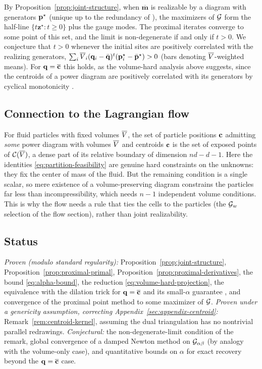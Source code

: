 \documentclass[main.tex]{subfiles}
\providecommand{\momset}{\mathcal{M}}            %
\providecommand{\tmom}{\overline{\mathbf{m}}}    %
\providecommand{\gen}{\mathbf{z}}                %
\providecommand{\convset}{\mathcal{C}}           %
\providecommand{\regdual}{\jointdual_{\alpha\beta}} %
\begin{document}
\begin{remark}
By Proposition~\ref{prop:joint-structure}, when $\tmom$ is realizable by a diagram with generators $\mathbf{p}^\star$ (unique up to the redundancy of \citet[Lemma~2.1]{Bourne2025Inverting}), the maximizers of $\mathcal{G}$ form the half-line $\{ t\gen^\star : t \ge 0 \}$ plus the gauge modes.
The proximal iterates converge to some point of this set, and the limit is non-degenerate if and only if $t > 0$.
We conjecture that $t > 0$ whenever the initial sites are positively correlated with the realizing generators, $\sum_i \overline{V}_i (\mathbf{q}_i - \bar{\mathbf{q}})^{t} (\mathbf{p}^\star_i - \bar{\mathbf{p}}^\star) > 0$ (bars denoting $\overline{V}$-weighted means).
For $\mathbf{q} = \overline{\mathbf{c}}$ this holds, as the volume-hard analysis above suggests, since the centroids of a power diagram are positively correlated with its generators by cyclical monotonicity \citep[Lemma~4.10]{Bourne2025Inverting}.
\end{remark}

\subsection{Connection to the Lagrangian flow}
\label{sec:joint-flow}

For fluid particles with fixed volumes $\overline{V}$, the set of particle positions $\mathbf{c}$ admitting \emph{some} power diagram with volumes $\overline{V}$ and centroids $\mathbf{c}$ is the set of exposed points of $\convset(\pvol)$, a dense part of its relative boundary of dimension $nd - d - 1$.
Here the identities \eqref{eq:partition-feasibility} are genuine hard constraints on the unknowns: they fix the center of mass of the fluid.
But the remaining condition is a single scalar, so mere existence of a volume-preserving diagram constrains the particles far less than incompressibility, which needs $n\!-\!1$ independent volume conditions.
This is why the flow needs a rule that ties the cells to the particles (the $\mathcal{G}_{w}$ selection of the flow section), rather than joint realizability.

\subsection{Status}
\label{sec:joint-status}

\emph{Proven (modulo standard regularity):} Proposition~\ref{prop:joint-structure}, Proposition~\ref{prop:proximal-primal}, Proposition~\ref{prop:proximal-derivatives}, the bound \eqref{eq:alpha-bound}, the reduction \eqref{eq:volume-hard-projection}, the equivalence with the dilation trick for $\mathbf{q} = \overline{\mathbf{c}}$ and its small-$\alpha$ guarantee \citep[Prop.~5.2]{Bourne2026ConvexOrder}, and convergence of the proximal point method to some maximizer of $\mathcal{G}$.
\emph{Proven under a genericity assumption, correcting Appendix~\ref{sec:appendix-centroid}:} Remark~\ref{rem:centroid-kernel}, assuming the dual triangulation has no nontrivial parallel redrawings.
\emph{Conjectural:} the non-degenerate-limit condition of the remark, global convergence of a damped Newton method on $\regdual$ (by analogy with the volume-only case), and quantitative bounds on $\alpha$ for exact recovery beyond the $\mathbf{q} = \overline{\mathbf{c}}$ case.

\ifSubfilesClassLoaded{%
  
  
}{}
\end{document}
